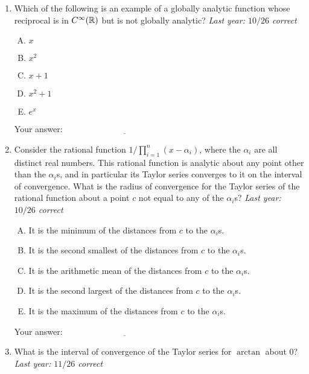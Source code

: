 \documentclass[10pt]{amsart}
\begin{document}
\begin{enumerate}
\item Which of the following is an example of a globally analytic
  function whose reciprocal is in $C^\infty(\mathbb{R})$ but is not globally
  analytic? {\em Last year: $10/26$ correct}

  \begin{enumerate}[(A)]
  \item $x$
  \item $x^2$
  \item $x + 1$
  \item $x^2 + 1$
  \item $e^x$
  \end{enumerate}

  \vspace{0.1in}
  Your answer: $\underline{\qquad\qquad\qquad\qquad\qquad\qquad\qquad}$
  \vspace{0.15in}

\item Consider the rational function $1/\prod_{i=1}^n (x - \alpha_i)$,
  where the $\alpha_i$ are all distinct real numbers. This rational
  function is analytic about any point other than the $\alpha_i$s, and
  in particular its Taylor series converges to it on the interval of
  convergence. What is the radius of convergence for the Taylor series
  of the rational function about a point $c$ not equal to any of the
  $\alpha_i$s? {\em Last year: $10/26$ correct}

  \begin{enumerate}[(A)]
  \item It is the minimum of the distances from $c$ to the $\alpha_i$s.
  \item It is the second smallest of the distances from $c$ to the
    $\alpha_i$s.
  \item It is the arithmetic mean of the distances from $c$ to the $\alpha_i$s.
  \item It is the second largest of the distances from $c$ to the
    $\alpha_i$s.
  \item It is the maximum of the distances from $c$ to the $\alpha_i$s.
  \end{enumerate}

  \vspace{0.1in}
  Your answer: $\underline{\qquad\qquad\qquad\qquad\qquad\qquad\qquad}$
  \vspace{0.15in}

\item What is the interval of convergence of the Taylor series for
  $\arctan$ about $0$? {\em Last year: $11/26$ correct}
  

\end{enumerate}
\end{document}
